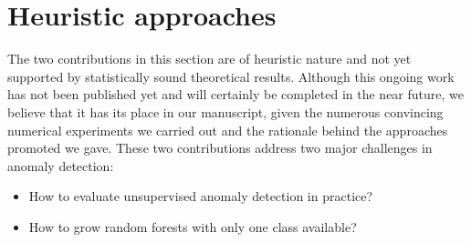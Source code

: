 



\section{Heuristic approaches}
\label{resume_fr:sec:heuristic}

The two contributions in this section are of heuristic nature and not yet supported by statistically sound theoretical results. Although this ongoing work has not been published yet and will certainly be completed in the near future, we believe that it has its place in our manuscript, given the numerous convincing numerical experiments we carried out and the rationale behind the approaches promoted we gave.
%
These two contributions address two major challenges in anomaly detection:

\begin{itemize}
\item How to evaluate unsupervised anomaly detection in practice?
\item How to grow random forests with only one class available?
\end{itemize}

